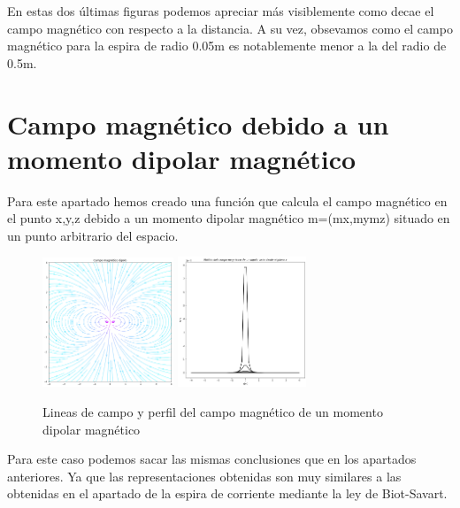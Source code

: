 \documentclass[11pt]{article}
\begin{document}
\vspace{5mm} En estas dos últimas figuras podemos apreciar más visiblemente como decae el campo magnético con respecto a la distancia. A su vez, obsevamos como el campo magnético para la espira de radio 0.05m es notablemente menor a la del radio de 0.5m.

\section{Campo magnético debido a un momento dipolar magnético}

\vspace{5mm} Para este apartado hemos creado una función que calcula el campo magnético en el punto x,y,z debido a un momento dipolar magnético m=(mx,mymz) situado en un punto arbitrario del espacio.

\begin{figure}[h]
    \centering
    \includegraphics[width=0.35\textwidth]{Mag 0.05 dipolo.png}
    \hspace{1cm}
    \includegraphics[width=0.342\textwidth]{Mag 0.05 dipolo z.png}
    \caption{Lineas de campo y perfil del campo magnético de un momento dipolar magnético}
\end{figure}

\vspace{5mm} Para este caso podemos sacar las mismas conclusiones que en los apartados anteriores. Ya que las representaciones obtenidas son muy similares a las obtenidas en el apartado de la espira de corriente mediante la ley de Biot-Savart.

\vspace{5mm}
\end{document}
